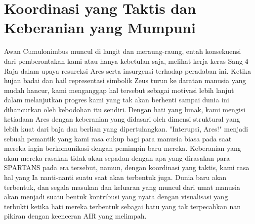 \section{Koordinasi yang Taktis dan Keberanian yang Mumpuni}

Awan Cumulonimbus muncul di langit dan meraung-raung, entah konsekuensi dari pemberontakan kami atau hanya kebetulan saja, melihat kerja keras Sang 4 Raja dalam upaya resureksi Ares serta insurgensi terhadap peradaban ini. Ketika hujan badai dan hail representasi simbolik Zeus turun ke daratan manusia yang mudah hancur, kami menganggap hal tersebut sebagai motivasi lebih lanjut dalam melanjutkan progres kami yang tak akan berhenti sampai dunia ini dihancurkan oleh kebodohan itu sendiri. Dengan hati yang lunak, kami mengisi ketiadaan Ares dengan keberanian yang didasari oleh dimensi struktural yang lebih kuat dari baja dan berlian yang dipertulangkan. "Interupsi, Ares!" menjadi sebuah pemantik yang kami rasa cukup bagi para manusia biasa pada saat mereka ingin berkomunikasi dengan pemimpin baru mereka. Keberanian yang akan mereka rasakan tidak akan sepadan dengan apa yang dirasakan para SPARTANS pada era tersebut, namun, dengan koordinasi yang taktis, kami rasa hal yang Ia nanti-nanti suatu saat akan terbentuk juga. Dunia baru akan terbentuk, dan segala masukan dan keluaran yang muncul dari umat manusia akan menjadi suatu bentuk kontribusi yang nyata dengan visualisasi yang terbukti ketika hati mereka terbentuk sebagai batu yang tak terpecahkan nan pikiran dengan keenceran AIR yang melimpah.